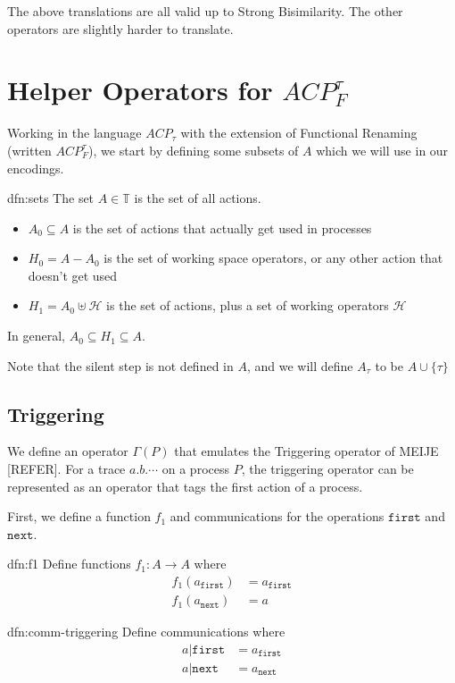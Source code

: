 \documentclass[logo,bsc,singlespacing,parskip,online]{infthesis}
\begin{document}
The above translations are all valid up to Strong Bisimilarity. The other operators are slightly harder to translate.

\section{Helper Operators for \texorpdfstring{$ACP_{F}^{\tau}$}{ACPtaur}}

Working in the language $ACP_{\tau}$ with the extension of Functional Renaming (written $ACP^{\tau}_{F}$), we start by defining some subsets of $A$ which we will use in our encodings.

\begin{dfn}[Subsets of A]{dfn:sets}{}
   The set $A\in \mathbb{T}$ is the set of all actions.
   \begin{itemize}
      \item $A_{0} \subseteq A$ is the set of actions that actually get used in processes
      \item $H_{0} = A - A_{0}$ is the set of working space operators, or any other action that doesn't get used
      \item $H_{1} = A_{0} \uplus \mathscr{H}$ is the set of actions, plus a set of working operators $\mathscr{H}$
   \end{itemize}

   In general, $A_{0} \subseteq H_{1} \subseteq A$.

   Note that the silent step is not defined in $A$, and we will define $A_{\tau}$ to be $A \cup \{\tau\}$
\end{dfn}

\newpage
\subsection{Triggering}
We define an operator $\Gamma(P)$ that emulates the Triggering operator of MEIJE [REFER]. For a trace $a.b.\cdots$ on a process $P$, the triggering operator can be represented as an operator that tags the first action of a process.

First, we define a function $f_{1}$ and communications for the operations $\mathtt{first}$ and $\mathtt{next}$.

\begin{multicols}{2}
   \begin{dfn}[F1]{dfn:f1}{}
      Define functions $f_{1}: A \to A$ where
      \begin{align*}
	 f_{1}(a_{\mathtt{first}}) &= a_{\mathtt{first}} \\
	 f_{1}(a_{\mathtt{next}}) &= a 
      \end{align*}
   \end{dfn}

   \begin{dfn-s}[Communications]{dfn:comm-triggering}{}
      Define communications where
      \begin{align*}
	 a | \mathtt{first} &= a_{\mathtt{first}}\\
	 a | \mathtt{next} &= a_{\mathtt{next}}
      \end{align*}
   \end{dfn-s}
\end{multicols}
\end{document}
